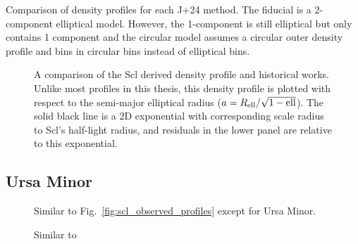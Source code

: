 Comparison of density profiles for each J+24 method. The fiducial is a
2-component elliptical model. However, the 1-component is still
elliptical but only contains 1 component and the circular model assumes
a circular outer density profile and bins in circular bins instead of
elliptical bins.

\begin{figure}
\centering
{}
\caption[Scl literature density profiles]{A comparison of the Scl
derived density profile and historical works. Unlike most profiles in
this thesis, this density profile is plotted with respect to the
semi-major elliptical radius (\(a = R_{\rm ell} / \sqrt{1-{\rm ell}}\)).
The solid black line is a 2D exponential with corresponding scale radius
to Scl's half-light radius, and residuals in the lower panel are
relative to this exponential.}
\end{figure}

\subsection{Ursa Minor}\label{ursa-minor}

\begin{figure}
\centering
{}
\caption[UMi density comparison]{Similar to
Fig.~\ref{fig:scl_observed_profiles} except for Ursa
Minor.}\label{fig:umi_density_extras}
\end{figure}

\begin{figure}
\centering
{}
\caption[UMi density profiles in literatures]{Similar to}
\end{figure}

